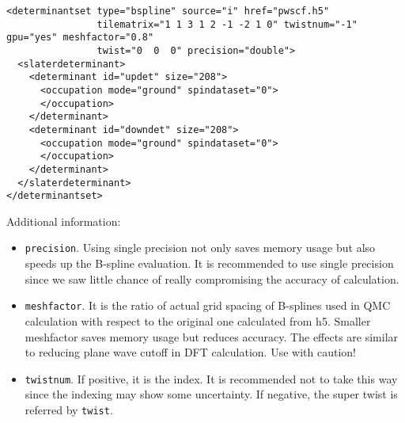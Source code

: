 
\begin{lstlisting}[caption=All electron Hamiltonian XML element.\label{listing:splineSPOs}]
<determinantset type="bspline" source="i" href="pwscf.h5"
                tilematrix="1 1 3 1 2 -1 -2 1 0" twistnum="-1" gpu="yes" meshfactor="0.8"
                twist="0  0  0" precision="double">
  <slaterdeterminant>
    <determinant id="updet" size="208">
      <occupation mode="ground" spindataset="0">
      </occupation>
    </determinant>
    <determinant id="downdet" size="208">
      <occupation mode="ground" spindataset="0">
      </occupation>
    </determinant>
  </slaterdeterminant>
</determinantset>
\end{lstlisting}

Additional information:
\begin{itemize}
\item \texttt{precision}. Using single precision not only saves memory usage but also speeds up the B-spline evaluation. It is recommended to use single precision since we saw little chance of really compromising the accuracy of calculation.
\item \texttt{meshfactor}. It is the ratio of actual grid spacing of B-splines used in QMC calculation with respect to the original one calculated from h5. Smaller meshfactor saves memory usage but reduces accuracy. The effects are similar to reducing plane wave cutoff in DFT calculation. Use with caution! 
\item \texttt{twistnum}. If positive, it is the index. It is recommended not to take this way since the indexing may show some uncertainty. If negative, the super twist is referred by \texttt{twist}.
\end{itemize}
\label{sec:splinebasis}
